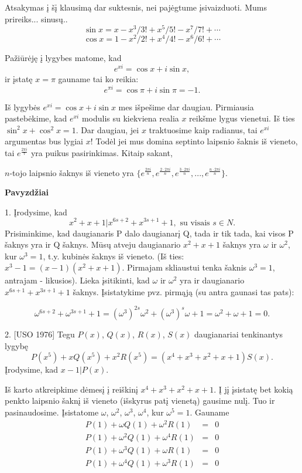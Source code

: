 Atsakymas į šį klausimą dar suktesnis, nei pajėgtume įsivaizduoti. Mums prireiks... sinusų..
$$\sin x = x - x^3/3! + x^5/5! - x^7/7! + \cdots$$ $$\cos x = 1 - x^2/2! + x^4/4! - x^6/6! + \cdots$$

Pažiūrėję į lygybes matome, kad $$e^{xi} = \cos x + i \sin x,$$ ir įstatę $x= \pi$ gauname tai ko reikia: $$e^{\pi i} = \cos \pi + i \sin \pi = -1.$$

Iš lygybės $e^{xi} = \cos x + i \sin x$ mes išpešime dar daugiau. Pirmiausia pastebėkime, kad $e^{xi}$ modulis su kiekviena realia $x$ reikšme lygus vienetui. Iš ties $\sin ^2 x + \cos ^2 x = 1$. Dar daugiau, jei $x$ traktuosime kaip radianus, tai $e^{x i}$ argumentas bus lygiai $x$! Todėl jei mus domina septinto laipsnio šaknis iš vieneto, tai $e^{\frac{2\pi i}{7}}$ yra puikus pasirinkimas. Kitaip sakant,
\begin{teig} $n$-tojo laipsnio šaknys iš vieneto yra $\{e^{\frac{2\pi i}{n}}, e^{\frac{2\cdot 2\pi i}{n}}, e^{\frac{3\cdot 2\pi i}{n}}, ... , e^{\frac{n\cdot 2\pi i}{n}}\}.$ \end{teig}

\bigskip

\begin{center}\textbf{Pavyzdžiai}\end{center}

1. Įrodysime, kad $$x^2 + x + 1 | x^{6s + 2} + x^{3s + 1} + 1, \text{ su visais } s \in N.$$
Prisiminkime, kad daugianaris P dalo daugianarį Q, tada ir tik tada, kai visos P šaknys yra ir Q šaknys. Mūsų atveju daugianario $x^2 + x + 1$ šaknys yra $\omega$ ir $\omega^2$, kur $\omega^3 = 1$, t.y. kubinės šaknys iš vieneto. (Iš ties: $x^3 - 1 = (x-1)(x^2+x+1)$. Pirmajam skliaustui tenka šaknis $\omega^3=1$, antrajam - likusios).
Lieka įsitikinti, kad $\omega$ ir $\omega^2$ yra ir daugianario $x^{6s + 1} + x^{3s + 1} + 1$ šaknys. Įsistatykime pvz. pirmąją (su antra gaunasi tas pats): 

$$\omega^{6s + 2} + \omega^{3s + 1} + 1 = (\omega^3)^{2s}\omega^{2} + (\omega^3)^{s}\omega + 1 = \omega^{2} + \omega + 1 = 0.$$
\medskip

2. [USO 1976] Tegu $P(x)$, $Q(x)$, $R(x)$, $S(x)$ daugianariai tenkinantys lygybę $$P(x^5) + xQ(x^5) + x^2R(x^5) = (x^4 + x^3 + x^2 + x + 1)S(x).$$ Įrodysime, kad $x-1|P(x).$

\smallskip
Iš karto atkreipkime dėmesį į reiškinį $x^4 + x^3 + x^2 + x + 1.$ Į jį įsistatę bet kokią penkto laipsnio šaknį iš vieneto (išskyrus patį vienetą) gausime nulį. Tuo ir pasinaudosime. Įsistatome $\omega$, $\omega^2$, $\omega^3$, $\omega^4$, kur $\omega^5 = 1$. Gauname 
\begin{eqnarray*}
P(1) + \omega Q(1) + \omega^2 R(1) &=& 0 \\
P(1) + \omega^2 Q(1) + \omega^4 R(1) &=& 0 \\
P(1) + \omega^3 Q(1) + \omega R(1) &=& 0 \\
P(1) + \omega^4 Q(1) + \omega^3 R(1) &=& 0 \\
\end{eqnarray*}

